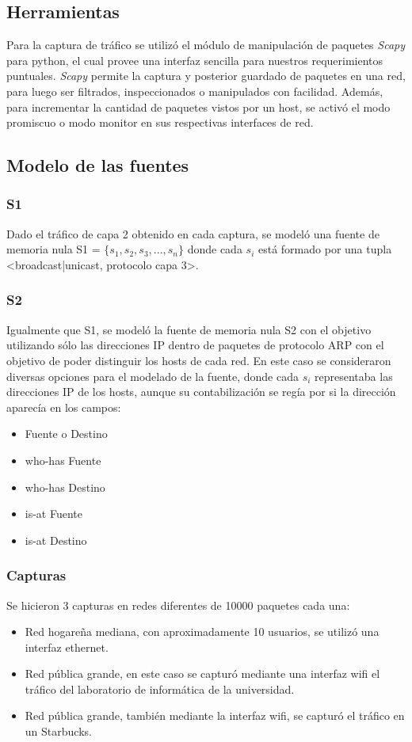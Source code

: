 \subsection{Herramientas}
Para la captura de tráfico se utilizó el módulo de manipulación de paquetes \emph{Scapy} para python, el cual provee una interfaz sencilla para nuestros requerimientos puntuales. \emph{Scapy} permite la captura y posterior guardado de paquetes en una red, para luego ser filtrados, inspeccionados o manipulados con facilidad. Además, para incrementar la cantidad de paquetes vistos por un host, se activó el modo promiscuo o modo monitor en sus respectivas interfaces de red.

\subsection{Modelo de las fuentes}

\subsubsection{S1}
Dado el tráfico de capa 2 obtenido en cada captura, se modeló una fuente de memoria nula S1 = $ \{ s_{1}, s_{2}, s_{3},...,s_{n} \}$ donde cada $ s_{i} $ está formado por una tupla <broadcast|unicast, protocolo capa 3>.

\subsubsection{S2}
Igualmente que S1, se modeló la fuente de memoria nula S2 con el objetivo utilizando sólo las direcciones IP dentro de paquetes de protocolo ARP con el objetivo de poder distinguir los hosts de cada red. En este caso se consideraron diversas opciones para el modelado de la fuente, donde cada $ s_{i} $ representaba las direcciones IP de los hosts, aunque su contabilización se regía por si la dirección aparecía en los campos:
\begin{itemize}
	\item Fuente o Destino
	\item who-has Fuente
	\item who-has Destino
	\item is-at Fuente
	\item is-at Destino
\end{itemize}

\subsubsection{Capturas}
Se hicieron 3 capturas en redes diferentes de 10000 paquetes cada una:
\begin{itemize}
	\item Red hogareña mediana, con aproximadamente 10 usuarios, se utilizó una interfaz ethernet.
	\item Red pública grande, en este caso se capturó mediante una interfaz wifi el tráfico del laboratorio de informática de la universidad.
	\item Red pública grande, también mediante la interfaz wifi, se capturó el tráfico en un Starbucks.
\end{itemize}